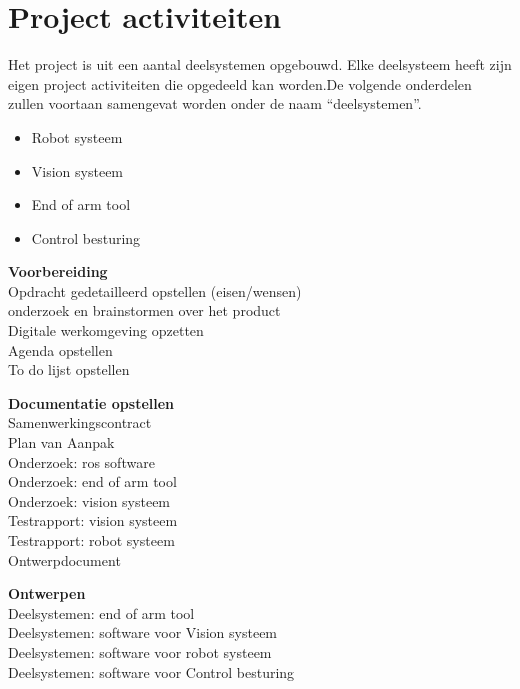 \begin{titlepage}
	
	\begin{figure}[h]
	\end{figure}
	
	\section{Project activiteiten}

	Het project is uit een aantal deelsystemen opgebouwd. Elke deelsysteem heeft zijn eigen project activiteiten die opgedeeld kan worden.De volgende onderdelen zullen voortaan samengevat worden onder de naam “deelsystemen”.
	
	\begin{itemize}
	    \item Robot systeem
	    \item Vision systeem
	    \item End of arm tool
	    \item Control besturing
	\end{itemize}
	
	\vspace{5mm}
	\textbf{Voorbereiding}
	\\Opdracht gedetailleerd opstellen (eisen/wensen)
	\\onderzoek en brainstormen over het product
	\\Digitale werkomgeving opzetten
  \\Agenda opstellen
  \\To do lijst opstellen
    
  \vspace{5mm} 
	\textbf{Documentatie opstellen}
	\\Samenwerkingscontract
  \\Plan van Aanpak
  \\Onderzoek: ros software
  \\Onderzoek: end of arm tool
  \\Onderzoek: vision systeem
  \\Testrapport: vision systeem
  \\Testrapport: robot systeem
  \\Ontwerpdocument

  \vspace{5mm}
	\textbf{Ontwerpen}
	\\Deelsystemen: end of arm tool
  \\Deelsystemen: software voor Vision systeem
  \\Deelsystemen: software voor robot systeem
  \\Deelsystemen: software voor Control besturing
    

\end{titlepage}
